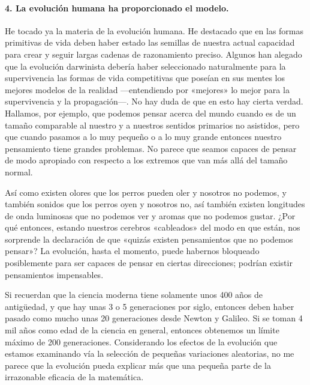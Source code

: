 \documentclass[a4paper, 12pt]{article}
\begin{document}
 

\paragraph*{4. La evolución humana ha proporcionado el modelo.}

 He tocado ya la materia de la evolución humana. He destacado que en las formas primitivas de vida deben haber estado las semillas de nuestra actual capacidad para crear y seguir largas cadenas de razonamiento preciso. Algunos   han alegado que la evolución darwinista debería haber seleccionado naturalmente para la supervivencia las formas de vida competitivas que poseían en sus mentes los mejores modelos de la realidad ---entendiendo por «mejores» lo mejor para la supervivencia y la propagación---. No hay duda de que en esto hay cierta verdad. Hallamos, por ejemplo, que podemos pensar acerca del mundo cuando es de un tamaño comparable al nuestro y a nuestros sentidos primarios no asistidos, pero que cuando pasamos a lo muy pequeño o a lo muy grande entonces nuestro pensamiento tiene grandes problemas. No parece que seamos capaces de pensar de modo apropiado con respecto a los extremos que van más allá del tamaño normal.

 

Así como existen olores que los perros pueden oler y nosotros no podemos, y también sonidos que los perros oyen y nosotros no, así también existen longitudes de onda luminosas que no podemos ver y aromas que no podemos gustar. ¿Por qué entonces, estando nuestros cerebros «cableados» del modo en que están, nos sorprende la declaración de que «quizás existen pensamientos que no podemos pensar»? La evolución, hasta el momento, puede habernos bloqueado posiblemente para ser capaces de pensar en ciertas direcciones; podrían existir pensamientos impensables.

 

Si recuerdan que la ciencia moderna tiene solamente unos 400 años de antigüedad, y que hay unas 3 o 5 generaciones por siglo, entonces deben haber pasado como mucho unas 20 generaciones desde Newton y Galileo. Si se toman 4 mil años como edad de la ciencia en general, entonces obtenemos un límite máximo de 200 generaciones. Considerando los efectos de la evolución que estamos examinando vía la selección de pequeñas variaciones aleatorias,  no me parece que la evolución pueda explicar más que una pequeña parte de la irrazonable eficacia de la matemática.

 
\end{document}
